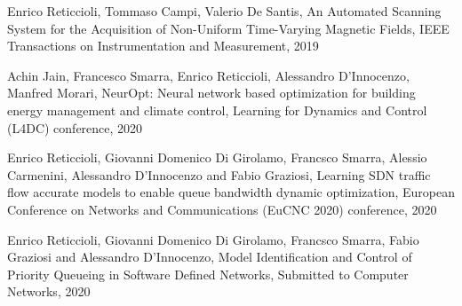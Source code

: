 \documentclass[12pt, a4paper, twoside, openright]{ociamthesis}  %
\begin{document}

%
%
%
%
%
%

%
%
%


%

\renewcommand{\bibname}{References}

\renewcommand{\bibname}{Publications}

\begin{thebibliography}{4}
 Enrico Reticcioli, Tommaso Campi, Valerio De Santis, An Automated Scanning System for the Acquisition of Non-Uniform Time-Varying Magnetic Fields, IEEE Transactions on Instrumentation and Measurement, 2019

Achin Jain, Francesco Smarra, Enrico Reticcioli, Alessandro D'Innocenzo, Manfred Morari, NeurOpt: Neural network based optimization for building energy management and climate control, Learning for Dynamics and Control (L4DC) conference, 2020

Enrico Reticcioli, Giovanni Domenico Di Girolamo, Francsco Smarra, Alessio Carmenini, Alessandro D’Innocenzo and Fabio Graziosi, Learning SDN traffic flow accurate models to enable queue bandwidth dynamic optimization, European Conference on Networks and Communications (EuCNC 2020) conference, 2020

Enrico Reticcioli, Giovanni Domenico Di Girolamo, Francsco Smarra, Fabio Graziosi and Alessandro D’Innocenzo, Model Identification and Control of Priority Queueing in Software Defined Networks, Submitted to Computer Networks, 2020
\end{thebibliography}
%
\end{document}
